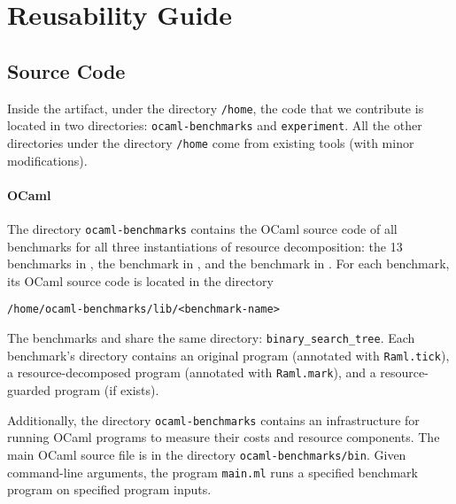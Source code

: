 
\section{Reusability Guide}
\label{sec:reusability-guide}

\subsection{Source Code}

Inside the artifact, under the directory \texttt{/home}, the code that we
contribute is located in two directories: \texttt{ocaml-benchmarks} and
\texttt{experiment}.
%
All the other directories under the directory \texttt{/home} come from existing
tools (with minor modifications).

\paragraph{OCaml}

The directory \texttt{ocaml-benchmarks} contains the OCaml source code of all
benchmarks for all three instantiations of resource decomposition: the 13
benchmarks in , the benchmark \kruskal{}
in , and the benchmark
\quicksorttiml{}\footnotemark in .
%
For each benchmark, its OCaml source code is located in the directory
\begin{verbatim}
/home/ocaml-benchmarks/lib/<benchmark-name>
\end{verbatim}
%
The benchmarks \unbalancedbst{} and \balancedbst{} share the same directory:
\texttt{binary\_search\_tree}.
%
Each benchmark's directory contains an original program (annotated with
\texttt{Raml.tick}), a resource-decomposed program (annotated with
\texttt{Raml.mark}), and a resource-guarded program (if exists).
%

Additionally, the directory \texttt{ocaml-benchmarks} contains an infrastructure
for running OCaml programs to measure their costs and resource components.
%
The main OCaml source file is  in the directory
\texttt{ocaml-benchmarks/bin}.
%
Given command-line arguments, the program \texttt{main.ml} runs a specified
benchmark program on specified program inputs.

